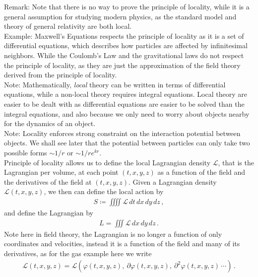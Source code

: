 \documentclass[11pt, onesided]{book}
\theoremstyle{break}
\theoremstyle{break}
\newcommand{\pd}{\partial}
\newcommand{\note}{\color{red}Note: \color{black}}
\newcommand{\remark}{\color{blue}Remark: \color{black}}
\newcommand{\example}{\color{green}Example: \color{black}}
\begin{document}
\remark Note that there is no way to prove the principle of locality, while it is a general assumption for studying modern physics, as the standard model and theory of general relativity are both local.\\

\example Maxwell's Equations respects the principle of locality as it is a set of differential equations, which describes how particles are affected by infinitesimal neighbors. While the Coulomb's Law and the gravitational laws do not respect the principle of locality, as they are just the approximation of the field theory derived from the principle of locality.\\

\note Mathematically, \textit{local} theory can be written in terms of differential equations, while a non-local theory requires integral equations. Local theory are easier to be dealt with as differential equations are easier to be solved than the integral equations, and also because we only need to worry about objects nearby for the dynamics of an object. \\

\note Locality enforces strong constraint on the interaction potential between objects. We shall see later that the potential between particles can only take two possible forms $\sim 1/r$ or $\sim 1/r e^{kr}$.\\


Principle of locality allows us to define the local Lagrangian density $\mathcal{L}$,  that is the Lagrangian per volume, at each point $(t,x,y,z)$ as a function of the field and the derivatives of the field at $(t,x,y,z)$. Given a Lagrangian density $\mathcal{L}(t,x,y,z)$, we then can define the local action by
\begin{align*}
S \coloneqq \iiiint \mathcal{L}\, dt\,dx\,dy\,dz\,,
\end{align*}
and define the Lagrangian by
\begin{align*}
L = \iiint \mathcal{L}\, dx\,dy\,dz\,.
\end{align*}
Note here in field theory, the Lagrangian is no longer a function of only coordinates and velocities, instead it is a function of the field and many of its derivatives, as for the gas example here we write
\begin{align*}
\mathcal{L} (t,x,y,z) = \mathcal{L}\left(\varphi(t,x,y,z), \ \pd \varphi(t,x,y,z), \ \pd^2 \varphi(t,x,y,z)\, \cdots\right)\,.
\end{align*}
\end{document}
